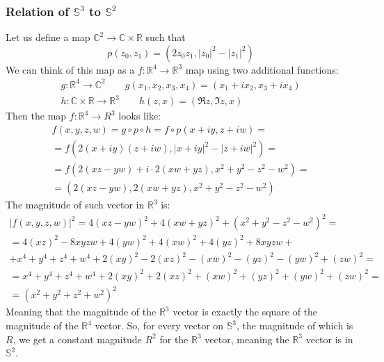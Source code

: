 \documentclass{article}
\newcommand{\R}{\ensuremath{\mathbb{R}}}
\newcommand{\C}{\ensuremath{\mathbb{C}}}
\begin{document}
\subsubsection{Relation of $\mathbb{S}^3$ to $\mathbb{S}^2$}
Let us define a map $\mathbb{C}^2 \rightarrow \mathbb{C}\times\R$ such that
\begin{equation}
    p(z_0, z_1) = (2z_0z_1, |z_0|^2 - |z_1|^2)
\end{equation}
We can think of this map as a $f: \R^4 \rightarrow \R^3$ map using two additional functions:
\begin{equation}
\begin{gathered}
    g: \R^4 \rightarrow \C^2 \qquad g(x_1, x_2, x_3, x_4) = (x_1 + ix_2, x_3 + ix_4) \\
    h: \C \times \R \rightarrow \R^3 \qquad h(z, x) = (\Re z, \Im z, x)
\end{gathered}
\end{equation}
Then the map $f: \R^4 \rightarrow R^3$ looks like:
\begin{equation}
\begin{gathered}
    f(x, y, z, w) = g \circ p \circ h = f \circ p (x + iy, z + iw) = \\ =
    f (2(x + iy)(z + iw), |x+iy|^2 - |z + iw|^2) = \\ =
    f(2(xz - yw) +i \cdot 2(xw + yz), x^2 + y^2 - z^2 - w^2) = \\ =
    (2(xz - yw), 2(xw + yz), x^2 + y^2 - z^2 - w^2)
\end{gathered}
\end{equation}
The magnitude of such vector in $\R^3$ is:
\begin{equation}
\begin{gathered}
    |f(x, y, z, w)|^2 = 4(xz - yw)^2 + 4(xw + yz)^2 + (x^2 + y^2 - z^2 - w^2)^2 = \\ =
    4(xz)^2 - 8xyzw + 4(yw)^2 + 4(xw)^2 + 4(yz)^2 + 8xyzw + \\ +
    x^4 + y^4 + z^4 + w^4 + 2(xy)^2 - 2(xz)^2 - (xw)^2 - (yz)^2 - (yw)^2 + (zw)^2 = \\ =
    x^4 + y^4 + z^4 + w^4 + 2(xy)^2 + 2(xz)^2 + (xw)^2 + (yz)^2 + (yw)^2 + (zw)^2 = \\ =
    (x^2 + y^2 + z^2 + w^2)^2
\end{gathered}
\end{equation}
Meaning that the magnitude of the $\R^3$ vector is exactly the square of the magnitude of the $\R^4$ vector. So, for every vector on $\mathbb{S}^3$, the magnitude of which is $R$, we get a constant magnitude $R^2$ for the $\R^3$ vector, meaning the $\R^3$ vector is in $\mathbb{S}^2$.
\end{document}
